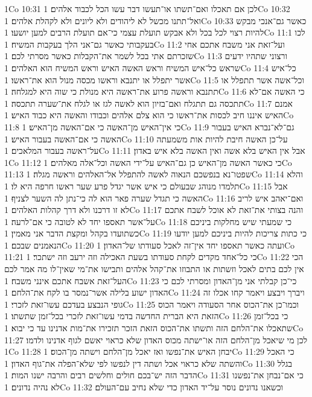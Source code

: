 1Co 10:31  לכן אם תאכלו ואם־תשתו או־תעשו דבר עשו הכל לכבוד אלהים׃
1Co 10:32  ואל־תתנו מכשל לא ליהודים ולא ליונים ולא לקהלת אלהים׃
1Co 10:33  כאשר גם־אנכי מבקש להיות רצוי לכל בכל ולא אבקש תועלת עצמי כי־אם תועלת הרבים למען יושעו׃
1Co 11:1  לכו בעקבותי כאשר גם־אני הלך בעקבות המשיח׃
1Co 11:2  ועל־זאת אני משבח אתכם אחי שזכרתם אתי בכל לשמר את־הקבלות כאשר מסרתי לכם׃
1Co 11:3  ורצוני שתהיו ידעים שראש כל־איש המשיח וראש האשה האיש וראש המשיח הוא האלהים׃
1Co 11:4  כל־איש אשר יתפלל או יתנבא וראשו מכסה מנול הוא את־ראשו׃
1Co 11:5  וכל־אשה אשר תתפלל או תתנבא וראשה פרוע את־ראשה היא מנולת כי שוה היא למגלחה׃
1Co 11:6  כי האשה אם־לא תתכסה גם תתגלח ואם־בזיון הוא לאשה לגז או לגלח את־שערה תתכסה׃
1Co 11:7  אמנם האיש איננו חיב לכסות את־ראשו כי הוא צלם אלהים וכבודו והאשה היא כבוד האיש׃
1Co 11:8  כי אין־האיש מן־האשה כי אם־האשה מן־האיש׃
1Co 11:9  גם־לא־נברא האיש בעבור האשה כי אם־האשה בעבור האיש׃
1Co 11:10  על־כן האשה חיבת להיות אות משמעתה על־ראשה בעבור המלאכים׃
1Co 11:11  אבל אין האיש בלא אשה ואין האשה בלא איש באדון׃
1Co 11:12  כי כאשר האשה מן־האיש כן גם־האיש על־ידי האשה וכל־אלה מאלהים׃
1Co 11:13  שפטו־נא בנפשכם הנאוה לאשה להתפלל אל־האלהים וראשה מגלה׃
1Co 11:14  והלא תלמדו מנוהג שבעולם כי איש אשר יגדל פרע שער ראשו חרפה היא לו׃
1Co 11:15  אבל האשה כי תגדל שערה פאר הוא לה כי־נתן לה השער לצניף׃
1Co 11:16  ואם־יאהב איש לריב לא זו דרכנו ולא דרך קהלות האלהים׃
1Co 11:17  והנה בצותי את־זאת לא אוכל לשבח אתכם על־אשר תאספו יחד לא לטובה כי אם־לרעה׃
1Co 11:18  כי שמעתי שיש מחלקות ביניכם כשתועדו בקהל ומקצת הדבר אני מאמין׃
1Co 11:19  כי כתות צריכות להיות ביניכם למען יודעו הנאמנים שבכם׃
1Co 11:20  ועתה כאשר תאספו יחד אין־זה לאכל סעודתו של־האדון׃
1Co 11:21  כי כל־אחד מקדים לקחת סעודתו בשעת האכילה וזה ירעב וזה ישתכר׃
1Co 11:22  הכי אין לכם בתים לאכל וזשתות או התבוזו את־קהל אלהים ותבישו את־מי שאין־לו מה אמר לכם העל־זאת אשבח אתכם אינני משבח׃
1Co 11:23  כי־כן קבלתי אני מן־האדון ומסרתי לכם כי האדון ישוע בלילה אשר־נמסר בו לקח את־הלחם׃
1Co 11:24  ויברך ויבצע ויאמר קחו אכלו זה גופי הנבצע בעדכם עשו־זאת לזכרי׃
1Co 11:25  וכמו־כן את־הכוס אחר הסעודה ויאמר הכוס הזאת היא הברית החדשה בדמי עשו־זאת לזכרי בכל־זמן שתשתו׃
1Co 11:26  כי בכל־זמן שתאכלו את־הלחם הזה ותשתו את־הכוס הזאת הזכר תזכירו את־מות אדנינו עד כי יבוא׃
1Co 11:27  לכן מי שיאכל מן־הלחם הזה או־ישתה מכוס האדון שלא כראוי יאשם לגוף אדנינו ולדמו׃
1Co 11:28  יבחן האיש את־נפשו ואז יאכל מן־הלחם וישתה מן־הכוס׃
1Co 11:29  כי האכל והשתה שלא כראוי אכל ושתה דין לנפשו לפי שלא־הפלה את־גוף האדון׃
1Co 11:30  בגלל הדבר הזה יש־בכם חולים וחלשים רבים והרבה ישנו המות׃
1Co 11:31  כי אם־נבחן את־נפשנו לא נהיה נדונים׃
1Co 11:32  וכשאנו נדונים נוסר על־יד האדון כדי שלא נחיב עם־העולם׃
